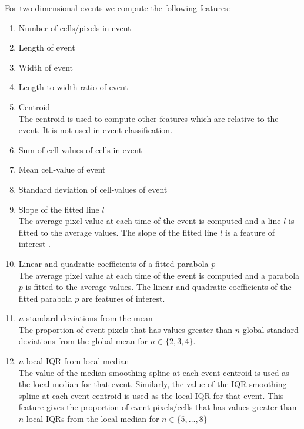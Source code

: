 \documentclass[11pt]{article}
\begin{document}
	 
	 For two-dimensional events we compute the following features:	 
	  \begin{enumerate}
	 	\item Number of cells/pixels in event
	 	\item Length of event
	 	\item Width of event
	 	\item Length to width ratio of event
	 	\item Centroid \\
	 	The centroid is used to compute other features which are relative to the event. It is not used in  event classification.
	 	\item Sum of cell-values of cells in event
	 	\item Mean cell-value of event
	 	\item Standard deviation of cell-values of event
	 	\item Slope of the fitted line $l$ \\
	 	The average pixel value at each time of the event is computed and a line  $l$  is fitted to the average values. The slope of the fitted line $l$ is a feature of interest . 
	 	\item Linear and quadratic coefficients of a fitted parabola $p$ \\
	 	The average pixel value at each time of the event is computed and a parabola  $p$  is fitted to the average values. The linear and quadratic coefficients of the fitted parabola $p$ are features of interest. 
	 	\item $n$ standard deviations from the mean \\
	 	The proportion of event pixels that has values greater than $n$ global standard deviations from the global mean for $n \in \{2, 3, 4\}$. 
	 	\item $n$ local IQR from local median \\
	 	The value of the median smoothing spline at each event centroid is used as the local median for that event. Similarly, the value of the IQR smoothing spline at each event centroid is used as the local IQR for that event. This feature gives the proportion of event pixels/cells that has values greater than $n$ local IQRs from the local median for $n \in \{ 5, \ldots, 8 \} $

\end{enumerate}
\end{document}
